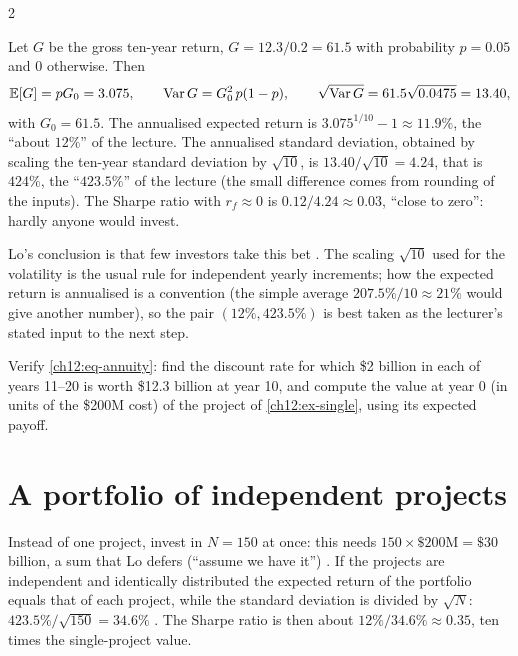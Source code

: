 \begin{paracol}{2}
\begin{example}\label{ch12:ex-single}
Let $G$ be the gross ten-year return, $G=12.3/0.2=61.5$ with probability $p=0.05$ and $0$ otherwise. Then
\[
  \mathbb{E}[G]=pG_0=3.075,\qquad \operatorname{Var} G=G_0^2\,p(1-p),\qquad \sqrt{\operatorname{Var} G}=61.5\sqrt{0.0475}=13.40,
\]
with $G_0=61.5$. The annualised expected return is $3.075^{1/10}-1\approx11.9\%$, the ``about $12\%$'' of the lecture. The
annualised standard deviation, obtained by scaling the ten-year standard deviation by $\sqrt{10}$, is
$13.40/\sqrt{10}=4.24$, that is $424\%$, the ``$423.5\%$'' of the lecture  (the small
difference comes from rounding of the inputs). The Sharpe ratio with $r_f\approx0$ is $0.12/4.24\approx0.03$,
``close to zero'': hardly anyone would invest.
\end{example}
Lo's conclusion is that few investors take this bet . The scaling $\sqrt{10}$ used for the
volatility is the usual rule for independent yearly increments; how the expected return is annualised is a convention
(the simple average $207.5\%/10\approx21\%$ would give another number), so the pair $(12\%,423.5\%)$ is best taken as
the lecturer's stated input to the next step.

\begin{exercise}
Verify \eqref{ch12:eq-annuity}: find the discount rate for which \$2 billion in each of years 11--20 is worth
\$12.3 billion at year 10, and compute the value at year 0 (in units of the \$200M cost) of the project of
\cref{ch12:ex-single}, using its expected payoff.
\end{exercise}

\section{A portfolio of independent projects}\label{ch12:sec-portfolio}

Instead of one project, invest in $N=150$ at once: this needs $150\times\$200\text{M}=\$30$ billion, a sum that
Lo defers (``assume we have it'') . If the projects are independent and identically distributed
the expected return of the portfolio equals that of each project, while
the standard deviation is divided by $\sqrt N$: $423.5\%/\sqrt{150}=34.6\%$ . The Sharpe ratio is
then about $12\%/34.6\%\approx0.35$, ten times the single-project value.


\end{paracol}
